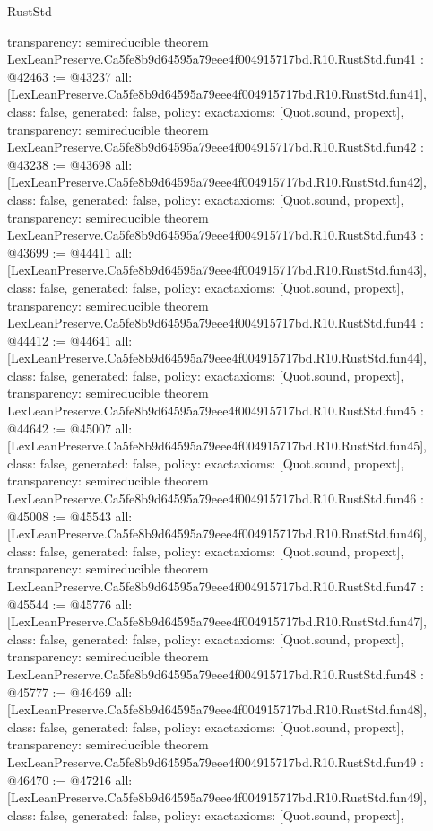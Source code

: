 \begin{lexlean}{RustStd}
\begin{coremodule}
{  transparency: semireducible
}
theorem LexLeanPreserve.Ca5fe8b9d64595a79eee4f004915717bd.R10.RustStd.fun41 : @42463 := @43237 {
  all: [LexLeanPreserve.Ca5fe8b9d64595a79eee4f004915717bd.R10.RustStd.fun41],
  class: false,
  generated: false,
  policy: exact{axioms: [Quot.sound, propext]},
  transparency: semireducible
}
theorem LexLeanPreserve.Ca5fe8b9d64595a79eee4f004915717bd.R10.RustStd.fun42 : @43238 := @43698 {
  all: [LexLeanPreserve.Ca5fe8b9d64595a79eee4f004915717bd.R10.RustStd.fun42],
  class: false,
  generated: false,
  policy: exact{axioms: [Quot.sound, propext]},
  transparency: semireducible
}
theorem LexLeanPreserve.Ca5fe8b9d64595a79eee4f004915717bd.R10.RustStd.fun43 : @43699 := @44411 {
  all: [LexLeanPreserve.Ca5fe8b9d64595a79eee4f004915717bd.R10.RustStd.fun43],
  class: false,
  generated: false,
  policy: exact{axioms: [Quot.sound, propext]},
  transparency: semireducible
}
theorem LexLeanPreserve.Ca5fe8b9d64595a79eee4f004915717bd.R10.RustStd.fun44 : @44412 := @44641 {
  all: [LexLeanPreserve.Ca5fe8b9d64595a79eee4f004915717bd.R10.RustStd.fun44],
  class: false,
  generated: false,
  policy: exact{axioms: [Quot.sound, propext]},
  transparency: semireducible
}
theorem LexLeanPreserve.Ca5fe8b9d64595a79eee4f004915717bd.R10.RustStd.fun45 : @44642 := @45007 {
  all: [LexLeanPreserve.Ca5fe8b9d64595a79eee4f004915717bd.R10.RustStd.fun45],
  class: false,
  generated: false,
  policy: exact{axioms: [Quot.sound, propext]},
  transparency: semireducible
}
theorem LexLeanPreserve.Ca5fe8b9d64595a79eee4f004915717bd.R10.RustStd.fun46 : @45008 := @45543 {
  all: [LexLeanPreserve.Ca5fe8b9d64595a79eee4f004915717bd.R10.RustStd.fun46],
  class: false,
  generated: false,
  policy: exact{axioms: [Quot.sound, propext]},
  transparency: semireducible
}
theorem LexLeanPreserve.Ca5fe8b9d64595a79eee4f004915717bd.R10.RustStd.fun47 : @45544 := @45776 {
  all: [LexLeanPreserve.Ca5fe8b9d64595a79eee4f004915717bd.R10.RustStd.fun47],
  class: false,
  generated: false,
  policy: exact{axioms: [Quot.sound, propext]},
  transparency: semireducible
}
theorem LexLeanPreserve.Ca5fe8b9d64595a79eee4f004915717bd.R10.RustStd.fun48 : @45777 := @46469 {
  all: [LexLeanPreserve.Ca5fe8b9d64595a79eee4f004915717bd.R10.RustStd.fun48],
  class: false,
  generated: false,
  policy: exact{axioms: [Quot.sound, propext]},
  transparency: semireducible
}
theorem LexLeanPreserve.Ca5fe8b9d64595a79eee4f004915717bd.R10.RustStd.fun49 : @46470 := @47216 {
  all: [LexLeanPreserve.Ca5fe8b9d64595a79eee4f004915717bd.R10.RustStd.fun49],
  class: false,
  generated: false,
  policy: exact{axioms: [Quot.sound, propext]},
}
\end{coremodule}
\end{lexlean}
